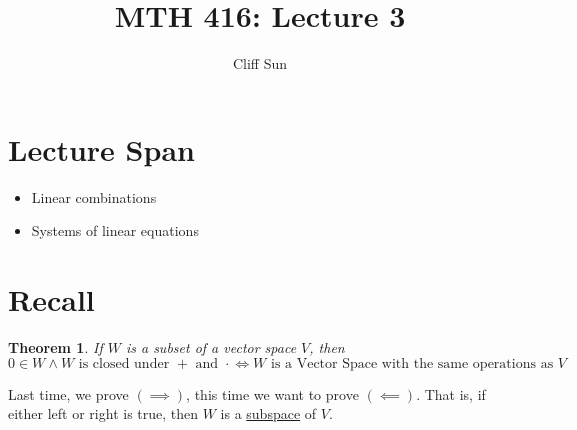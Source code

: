 \documentclass{article}
\title{MTH 416: Lecture 3}
\author{Cliff Sun}
\newtheorem{theorem}{Theorem}[section]
\newtheorem{one minute paper}[theorem]{One Minute Paper}
\begin{document}
\maketitle

\section*{Lecture Span}
\begin{itemize}
    \item Linear combinations
    \item Systems of linear equations
\end{itemize}

\section*{Recall}

\begin{theorem}
    If $W$ is a subset of a vector space $V$, then 
    \begin{equation}
        0 \in W \land W \text{ is closed under $+$ and $\cdot$} \iff W \text{ is a Vector Space with the same operations as $V$}
    \end{equation}
\end{theorem}

Last time, we prove $(\implies)$, this time we want to prove $(\impliedby)$. That is, if either left or right is true, then $W$ is a \underline{subspace} of $V$. 
\end{document}
